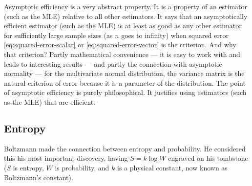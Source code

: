 \documentclass[11pt]{article}
\begin{document}
Asymptotic efficiency is a very abstract property.  It is a property of an
estimator (such as the MLE) relative to all other estimators.  It says that
an asymptotically efficient estimator (such as the MLE) is at least as good
as any other estimator for sufficiently large sample sizes (as $n$ goes to
infinity) when squared error \eqref{eq:squared-error-scalar} or
\eqref{eq:squared-error-vector} is the criterion.  And why that criterion?
Partly mathematical convenience --- it is easy to work with and leads to
interesting results --- and partly the connection with asymptotic normality
--- for the multivariate normal distribution, the variance matrix is the
natural criterion of error because it is a parameter of the distribution.
The point of asymptotic efficiency is purely philosophical.  It justifies
using estimators (such as the MLE) that are efficient.

\subsection{Entropy} \label{sec:entropy}

Boltzmann made the connection between entropy and probability.
He considered this his most important discovery, having $S = k \log W$
engraved on his tombstone ($S$ is entropy, $W$ is probability, and $k$
is a physical constant, now known as Boltzmann's constant).
\end{document}
